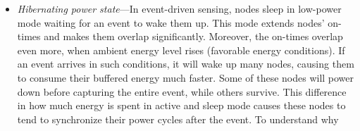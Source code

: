 \begin{itemize}[leftmargin=*]
\begin{figure}
{	}
	\label{fig:noRand}
\end{figure} 
%
	\item \label{it:hibernating} \textit{Hibernating power state}---In event-driven sensing, nodes sleep in low-power mode waiting for an event to wake them up. This mode extends \cis nodes' on-times and makes them overlap significantly. Moreover, the on-times overlap even more, when ambient energy level rises (favorable energy conditions). If an event arrives in such conditions, it will wake up many nodes, causing them to consume their buffered energy much faster. Some of these nodes will power down before capturing the entire event, while others survive. This difference in how much energy is spent in active and sleep mode causes these nodes to tend to synchronize their power cycles after the event. To understand why

\end{itemize}
